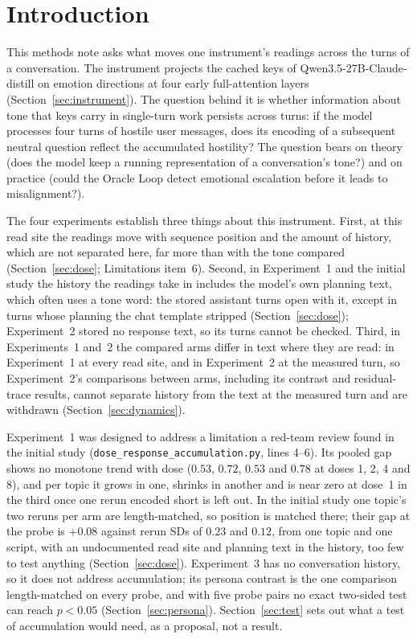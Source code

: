 \documentclass[11pt,a4paper]{article}
\begin{document}
\section{Introduction}

This methods note asks what moves one instrument's readings across the
turns of a conversation. The instrument projects the cached keys of
Qwen3.5-27B-Claude-distill on emotion directions at four early
full-attention layers (Section~\ref{sec:instrument}). The question
behind it is whether information about tone that keys carry in
single-turn work persists across turns: if the model processes four
turns of hostile user messages, does its encoding of a subsequent
neutral question reflect the accumulated hostility? The question bears
on theory (does the model keep a running representation of a
conversation's tone?) and on practice (could the Oracle Loop
\citep{lyra2026oracleloop} detect
emotional escalation before it leads to misalignment?).

The four experiments establish three things about this instrument.
First, at this read site the readings move with sequence position and
the amount of history, which are not separated here, far more than with
the tone compared (Section~\ref{sec:dose}; Limitations item~6). Second,
in Experiment~1 and the initial study the history the readings take in
includes the model's own planning text, which often uses a tone word:
the stored assistant turns open with it, except in turns whose planning
the chat template stripped (Section~\ref{sec:dose}); Experiment~2 stored no response text, so its
turns cannot be checked. Third, in Experiments~1 and~2 the compared
arms differ in text where they are read: in Experiment~1 at every read
site, and in Experiment~2 at the measured turn, so Experiment~2's
comparisons between arms, including its contrast and residual-trace
results, cannot separate history from the text at the measured turn
and are withdrawn (Section~\ref{sec:dynamics}).

{\sloppy Experiment~1 was designed to address a limitation a red-team
review found in the initial study
(\texttt{dose\_\allowbreak response\_\allowbreak accumulation.py}, lines 4--6).
Its pooled gap shows no monotone trend with dose ($0.53$, $0.72$, $0.53$
and $0.78$ at doses 1, 2, 4 and 8), and per topic it grows in one,
shrinks in another and is near zero at dose~1 in the third once one
rerun encoded short is left out. In the initial study one topic's two
reruns per arm are length-matched, so position is matched there; their
gap at the probe is $+0.08$ against rerun SDs of $0.23$ and $0.12$,
from one topic and one script, with an undocumented read site and
planning text in the history, too few to test anything (Section~\ref{sec:dose}). Experiment~3 has
no conversation history, so it does not address accumulation; its
persona contrast is the one comparison length-matched on every probe,
and with five probe pairs no exact two-sided test can reach $p{<}0.05$
(Section~\ref{sec:persona}). Section~\ref{sec:test} sets out what a test
of accumulation would need, as a proposal, not a result.\par}
\end{document}
